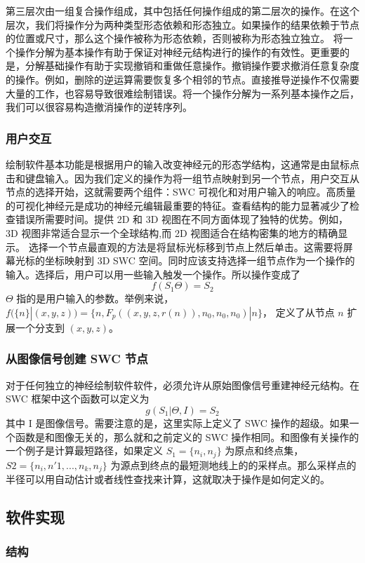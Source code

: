 {第三层次由一组复合操作组成，其中包括任何操作组成的第二层次的操作。在这个层次，我们将操作分为两种类型形态依赖和形态独立。如果操作的结果依赖于节点的位置或尺寸，那么这个操作被称为形态依赖，否则被称为形态独立独立。
将一个操作分解为基本操作有助于保证对神经元结构进行的操作的有效性。更重要的是，分解基础操作有助于实现撤销和重做任意操作。撤销操作要求撤消任意复杂度的操作。例如，删除的逆运算需要恢复多个相邻的节点。直接推导逆操作不仅需要大量的工作，也容易导致很难绘制错误。将一个操作分解为一系列基本操作之后，我们可以很容易构造撤消操作的逆转序列。

\subsubsection{用户交互}
绘制软件基本功能是根据用户的输入改变神经元的形态学结构，这通常是由鼠标点击和键盘输入。因为我们定义的操作为将一组节点映射到另一个节点，用户交互从节点的选择开始，这就需要两个组件：SWC 可视化和对用户输入的响应。高质量的可视化神经元是成功的神经元编辑最重要的特征。查看结构的能力显著减少了检查错误所需要时间。提供 2D 和 3D 视图在不同方面体现了独特的优势。例如，3D 视图非常适合显示一个全球结构,而 2D 视图适合在结构密集的地方的精确显示。
选择一个节点最直观的方法是将鼠标光标移到节点上然后单击。这需要将屏幕光标的坐标映射到 3D SWC 空间。同时应该支持选择一组节点作为一个操作的输入。选择后，用户可以用一些输入触发一个操作。所以操作变成了
$$f(S_1\Theta) = S_2$$
$\Theta$ 指的是用户输入的参数。举例来说， $f(\{n\}|(x, y, z)) = \{n, F_p((x, y, z, r(n)), n_0, n_0, n_0)|n\}$， 定义了从节点 $n$ 扩展一个分支到 $(x,y,z)$。

\subsubsection{从图像信号创建 SWC 节点}
对于任何独立的神经绘制软件软件，必须允许从原始图像信号重建神经元结构。在 SWC 框架中这个函数可以定义为
$$g(S_1|\Theta , I) = S_2$$
其中 I 是图像信号。需要注意的是，这里实际上定义了 SWC 操作的超级。如果一个函数是和图像无关的，那么就和之前定义的 SWC 操作相同。和图像有关操作的一个例子是计算最短路径，如果定义 $S_1 = \{n_i, n_j\}$ 为原点和终点集，$S2 = \{n_i, n'1,...,n_k, n_j\}$ 为源点到终点的最短测地线上的的采样点。那么采样点的半径可以用自动估计或者线性查找来计算，这就取决于操作是如何定义的。

\subsection{软件实现}

\subsubsection{结构}

}
